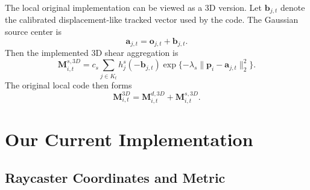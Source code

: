 \documentclass[11pt]{article}
\begin{document}
The local original implementation can be viewed as a 3D version. Let
$\mathbf{b}_{j,t}$ denote the calibrated displacement-like tracked vector used
by the code. The Gaussian source center is
\begin{equation}
    \mathbf{a}_{j,t}
    =
    \mathbf{o}_{j,t}
    +
    \mathbf{b}_{j,t}.
    \label{eq:original-code-center}
\end{equation}
Then the implemented 3D shear aggregation is
\begin{equation}
    \mathbf{M}^{s,3D}_{i,t}
    =
    c_s
    \sum_{j\in K_t}
    h^s_j
    (-\mathbf{b}_{j,t})
    \exp\{
        -\lambda_s
        \|\mathbf{p}_i-\mathbf{a}_{j,t}\|_2^2
    \}.
    \label{eq:original-code-shear}
\end{equation}
The original local code then forms
\begin{equation}
    \mathbf{M}^{3D}_{i,t}
    =
    \mathbf{M}^{d,3D}_{i,t}
    +
    \mathbf{M}^{s,3D}_{i,t}.
    \label{eq:original-code-total}
\end{equation}

\section{Our Current Implementation}

\subsection{Raycaster Coordinates and Metric}
\end{document}
